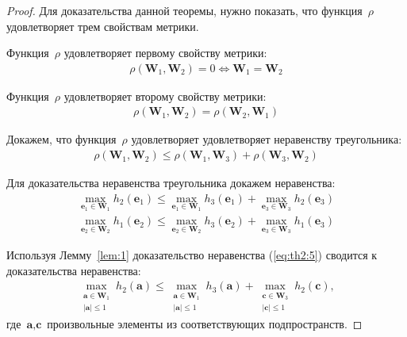 \documentclass[12pt, twoside]{article}
\numberwithin{equation}{section}
\begin{document}
\begin{proof}
Для доказательства данной теоремы, нужно показать, что функция~$\rho$ удовлетворяет трем свойствам метрики.

Функция~$\rho$ удовлетворяет первому свойству метрики:
\begin{equation}
\label{eq:th2:2}
\begin{aligned}
\rho\left(\textbf{W}_1, \textbf{W}_2\right) = 0 \Leftrightarrow \textbf{W}_1 = \textbf{W}_2
\end{aligned}
\end{equation}

Функция~$\rho$ удовлетворяет второму свойству метрики:
\begin{equation}
\label{eq:th2:3}
\begin{aligned}
\rho\left(\textbf{W}_1, \textbf{W}_2\right) = \rho\left(\textbf{W}_2, \textbf{W}_1\right)
\end{aligned}
\end{equation}

Докажем, что функция~$\rho$ удовлетворяет удовлетворяет неравенству треугольника:
\begin{equation}
\label{eq:th2:4}
\begin{aligned}
\rho\left(\textbf{W}_1, \textbf{W}_2\right) \leq \rho\left(\textbf{W}_1, \textbf{W}_3\right) + \rho\left(\textbf{W}_3, \textbf{W}_2\right)
\end{aligned}
\end{equation}

Для доказательства неравенства треугольника докажем неравенства:
\begin{equation}
\label{eq:th2:5}
\begin{aligned}
\max_{\textbf{e}_1 \in \textbf{W}_1}h_{2}\left(\textbf{e}_1\right) \leq 
\max_{\textbf{e}_1\in \textbf{W}_1}h_{3}\left(\textbf{e}_1\right)+
\max_{\textbf{e}_3 \in \textbf{W}_3}h_{2}\left(\textbf{e}_3\right) \\
\max_{\textbf{e}_2 \in \textbf{W}_2}h_{1}\left(\textbf{e}_2\right) \leq 
\max_{\textbf{e}_2\in \textbf{W}_2}h_{3}\left(\textbf{e}_2\right)+
\max_{\textbf{e}_3 \in \textbf{W}_3}h_{1}\left(\textbf{e}_3\right)
\end{aligned}
\end{equation}

Используя Лемму~\ref{lem:1} доказательство неравенства (\ref{eq:th2:5}) сводится к доказательства неравенства:
\begin{equation}
\label{eq:th2:6}
\begin{aligned}
\max_{\substack{\textbf{a} \in \textbf{W}_1 \\ \left|\textbf{a}\right| \leq 1}}h_{2}\left(\textbf{a}\right) \leq 
\max_{\substack{\textbf{a} \in \textbf{W}_1 \\ \left|\textbf{a}\right| \leq 1}}h_{3}\left(\textbf{a}\right)+
\max_{\substack{\textbf{c} \in \textbf{W}_3 \\ \left|\textbf{c}\right| \leq 1}}h_{2}\left(\textbf{c}\right),
\end{aligned}
\end{equation}
где~$\textbf{a}, \textbf{c}$ произвольные элементы из соответствующих подпространств. 


\end{proof}
\end{document}
